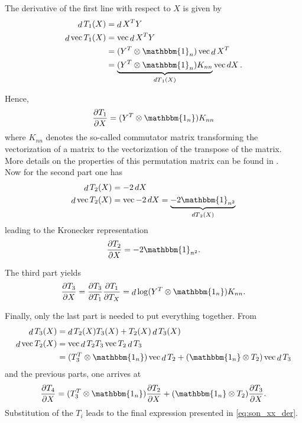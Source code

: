 The derivative of the first line with respect to $X$ is given by
\begin{align}
\mathop{d}T_1(X)&=\mathop{d}X^TY\\
\mathop{d}\operatorname{vec}T_1(X)&= \operatorname{vec}\mathop{d}X^TY\\
			&=(Y^T\otimes\mathbbm{1}_n)  \operatorname{vec}\mathop{d}X^T\\
			&=\underbrace{(Y^T\otimes\mathbbm{1}_n)K_{nn}}_{\mathop{dT}_1(X)}  \operatorname{vec}\mathop{dX}.
\end{align}

Hence, 
\begin{equation}
\frac{\partial T_1}{\partial X} = (Y^T\otimes\mathbbm{1_n})K_{nn}
\end{equation}
where $K_{nn}$ denotes the so-called commutator matrix transforming the vectorization
of a matrix to the vectorization of the transpose of the matrix. More details
on the properties of this permutation matrix can be found in \cite{Magnus}.\\

Now for the second part one has
\begin{align}
\mathop{d}T_2(X)&=-2\mathop{dX}\\
\mathop{d}\operatorname{vec}T_2(X)&= \operatorname{vec}-2\mathop{dX} = \underbrace{-2\mathbbm{1}_{n^2}}_{\mathop{dT}_2(X)}
\end{align}
leading to the Kronecker representation
\begin{equation}
\frac{\partial T_2}{\partial X} = -2\mathbbm{1}_{n^2}.
\end{equation}

The third part yields
\begin{equation}
\frac{\partial T_3}{\partial X} = \frac{\partial T_3}{\partial T_1}\frac{\partial T_1}{\partial T_X}=
\mathop{d}\log(Y^T\otimes\mathbbm{1_n})K_{nn}.
\end{equation}

Finally, only the last part is needed to put everything together. From 
\begin{align}
\mathop{d}T_3(X)&=\mathop{d}T_2(X)T_3(X)+T_2(X)\mathop{d}T_3(X)\\
\mathop{d}\operatorname{vec}T_2(X)&=\operatorname{vec}\mathop{d}T_2T_3
\operatorname{vec}T_2\mathop{d}T_3\\
&=(T_3^T\otimes\mathbbm{1_n})\operatorname{vec}\mathop{d}T_2 + 
(\mathbbm{1_n}\otimes T_2)\operatorname{vec}\mathop{d}T_3
\end{align}
and the previous parts, one arrives at 
\begin{equation}
\frac{\partial T_4}{\partial X} = (T_3^T\otimes\mathbbm{1_n})\frac{\partial T_2}{\partial X} + 
(\mathbbm{1_n}\otimes T_2)\frac{\partial T_3}{\partial X}.
\end{equation}
Substitution of the $T_i$ leads to the final expression presented in \ref{eq:son_xx_der}.










